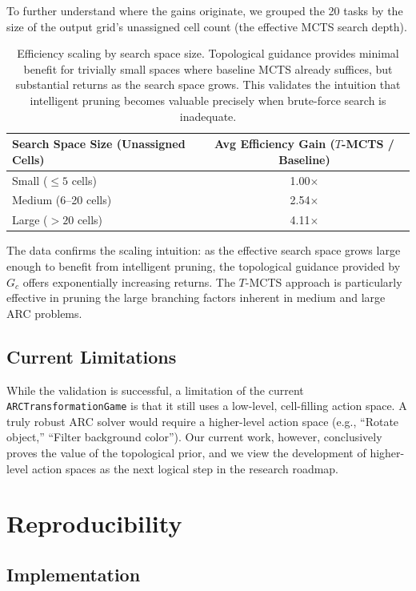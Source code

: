 \documentclass[11pt]{article}
\begin{document}
To further understand where the gains originate, we grouped the 20 tasks by the size of the output grid's unassigned cell count (the effective MCTS search depth).

\begin{table}[h]
\centering
\begin{tabular}{lc}
\toprule
\textbf{Search Space Size (Unassigned Cells)} & \textbf{Avg Efficiency Gain ($T$-MCTS / Baseline)} \\
\midrule
Small ($\leq 5$ cells) & 1.00$\times$ \\
Medium (6--20 cells) & 2.54$\times$ \\
Large ($> 20$ cells) & 4.11$\times$ \\
\bottomrule
\end{tabular}
\caption{Efficiency scaling by search space size. Topological guidance provides minimal benefit for trivially small spaces where baseline MCTS already suffices, but substantial returns as the search space grows. This validates the intuition that intelligent pruning becomes valuable precisely when brute-force search is inadequate.}
\label{tab:scaling}
\end{table}

The data confirms the scaling intuition: as the effective search space grows large enough to benefit from intelligent pruning, the topological guidance provided by $G_c$ offers exponentially increasing returns. The $T$-MCTS approach is particularly effective in pruning the large branching factors inherent in medium and large ARC problems.

\subsection{Current Limitations}

While the validation is successful, a limitation of the current \texttt{ARCTransformationGame} is that it still uses a low-level, cell-filling action space. A truly robust ARC solver would require a higher-level action space (e.g., ``Rotate object,'' ``Filter background color''). Our current work, however, conclusively proves the value of the topological prior, and we view the development of higher-level action spaces as the next logical step in the research roadmap.

\section{Reproducibility}

\subsection{Implementation}
\end{document}
